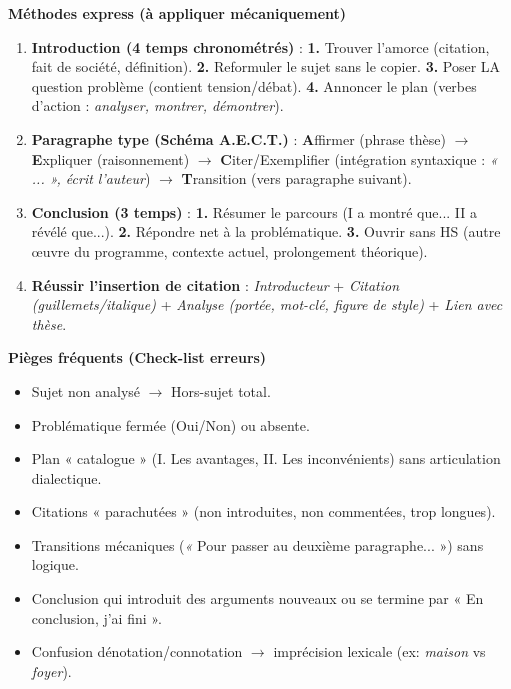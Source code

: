 \documentclass[11pt]{article}
\begin{document}
\begin{bilan}
\textbf{Méthodes express (à appliquer mécaniquement)}
\begin{enumerate}
    \item \textbf{Introduction (4 temps chronométrés)} : \textbf{1.} Trouver l'amorce (citation, fait de société, définition). \textbf{2.} Reformuler le sujet sans le copier. \textbf{3.} Poser LA question problème (contient tension/débat). \textbf{4.} Annoncer le plan (verbes d'action : \emph{analyser, montrer, démontrer}).
    \item \textbf{Paragraphe type (Schéma A.E.C.T.)} : \textbf{A}ffirmer (phrase thèse) $\rightarrow$ \textbf{E}xpliquer (raisonnement) $\rightarrow$ \textbf{C}iter/Exemplifier (intégration syntaxique : \emph{« ... », écrit l'auteur}) $\rightarrow$ \textbf{T}ransition (vers paragraphe suivant).
    \item \textbf{Conclusion (3 temps)} : \textbf{1.} Résumer le parcours (I a montré que... II a révélé que...). \textbf{2.} Répondre net à la problématique. \textbf{3.} Ouvrir sans HS (autre œuvre du programme, contexte actuel, prolongement théorique).
    \item \textbf{Réussir l'insertion de citation} : \emph{Introducteur} + \emph{Citation (guillemets/italique)} + \emph{Analyse (portée, mot-clé, figure de style)} + \emph{Lien avec thèse}.
\end{enumerate}

\textbf{Pièges fréquents (Check-list erreurs)}
\begin{itemize}
    \item Sujet non analysé $\rightarrow$ Hors-sujet total.
    \item Problématique fermée (Oui/Non) ou absente.
    \item Plan « catalogue » (I. Les avantages, II. Les inconvénients) sans articulation dialectique.
    \item Citations « parachutées » (non introduites, non commentées, trop longues).
    \item Transitions mécaniques (\emph« Pour passer au deuxième paragraphe... ») sans logique.
    \item Conclusion qui introduit des arguments nouveaux ou se termine par « En conclusion, j'ai fini ».
    \item Confusion dénotation/connotation $\rightarrow$ imprécision lexicale (ex: \emph{maison} vs \emph{foyer}).
\end{itemize}
\end{bilan}
\end{document}
